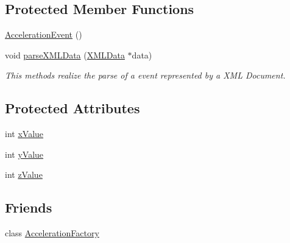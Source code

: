 \subsection*{Protected Member Functions}
\begin{DoxyCompactItemize}
\item 
\hyperlink{classbr_1_1ufscar_1_1lince_1_1mmi_1_1AccelerationEvent_aaf9298b6242c8894e04111a344add1fe}{AccelerationEvent} ()
\item 
void \hyperlink{classbr_1_1ufscar_1_1lince_1_1mmi_1_1AccelerationEvent_a5ad5b14f13e40450e619ce08e4ba9937}{parseXMLData} (\hyperlink{structbr_1_1ufscar_1_1lince_1_1mmi_1_1XMLData}{XMLData} $\ast$data)
\begin{DoxyCompactList}\small\item\em This methods realize the parse of a event represented by a XML Document. \item\end{DoxyCompactList}\end{DoxyCompactItemize}
\subsection*{Protected Attributes}
\begin{DoxyCompactItemize}
\item 
int \hyperlink{classbr_1_1ufscar_1_1lince_1_1mmi_1_1AccelerationEvent_aa8aa3708d87ebf38147a09b4d83eb604}{xValue}
\item 
int \hyperlink{classbr_1_1ufscar_1_1lince_1_1mmi_1_1AccelerationEvent_a1b87b4708c1f8ce65293b7fc3a148183}{yValue}
\item 
int \hyperlink{classbr_1_1ufscar_1_1lince_1_1mmi_1_1AccelerationEvent_a2fea6058c45c23e43ce8eb6f829a4990}{zValue}
\end{DoxyCompactItemize}
\subsection*{Friends}
\begin{DoxyCompactItemize}
\item 
class \hyperlink{classbr_1_1ufscar_1_1lince_1_1mmi_1_1AccelerationEvent_a5414bf6fb99d97af5a0b33c831e67026}{AccelerationFactory}
\end{DoxyCompactItemize}


